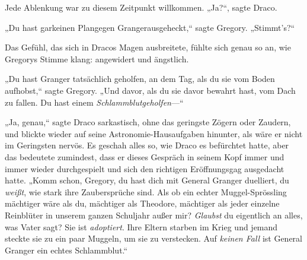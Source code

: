 Jede Ablenkung war zu diesem Zeitpunkt willkommen. „Ja?“, sagte Draco.

„Du hast garkeinen Plangegen Grangerausgeheckt,“ sagte Gregory. „Stimmt’s?“

Das Gefühl, das sich in Dracos Magen ausbreitete, fühlte sich genau so an, wie Gregorys Stimme klang: angewidert und ängstlich.

„Du hast Granger tatsächlich geholfen, an dem Tag, als du sie vom Boden aufhobst,“ sagte Gregory. „Und davor, als du sie davor bewahrt hast, vom Dach zu fallen. Du hast einem \emph{Schlammblutgeholfen}—“

„Ja, genau,“ sagte Draco sarkastisch, ohne das geringste Zögern oder Zaudern, und blickte wieder auf seine Astronomie-Hausaufgaben hinunter, als wäre er nicht im Geringsten nervös. Es geschah alles so, wie Draco es befürchtet hatte, aber das bedeutete zumindest, dass er dieses Gespräch in seinem Kopf immer und immer wieder durchgespielt und sich den richtigen Eröffnungsgag ausgedacht hatte. „Komm schon, Gregory, du hast dich mit General Granger duelliert, du \emph{weißt}, wie stark ihre Zaubersprüche sind. Als ob ein echter Muggel-Sprössling mächtiger wäre als du, mächtiger als Theodore, mächtiger als jeder einzelne Reinblüter in unserem ganzen Schuljahr außer mir? \emph{Glaubst} du eigentlich an alles, was Vater sagt? Sie ist \emph{adoptiert}. Ihre Eltern starben im Krieg und jemand steckte sie zu ein paar Muggeln, um sie zu verstecken. Auf \emph{keinen Fall} ist General Granger ein echtes Schlammblut.“

